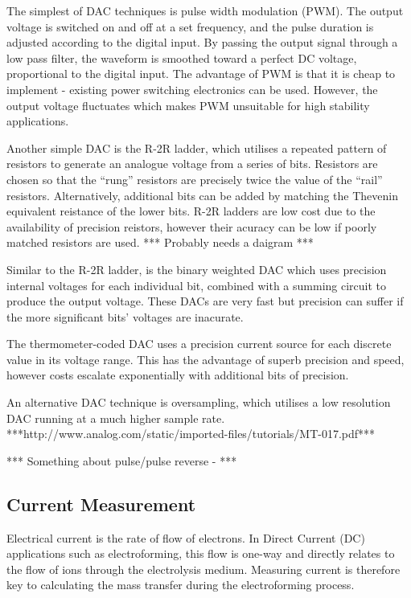 The simplest of DAC techniques is pulse width modulation (PWM). The output voltage is switched on and off at a set frequency, and the pulse duration is adjusted according to the digital input. By passing the output signal through a low pass filter, the waveform is smoothed toward a perfect DC voltage, proportional to the digital input. The advantage of PWM is that it is cheap to implement - existing power switching electronics can be used. However, the output voltage fluctuates which makes PWM unsuitable for high stability applications.

Another simple DAC is the R-2R ladder, which utilises a repeated pattern of resistors to generate an analogue voltage from a series of bits. Resistors are chosen so that the ``rung'' resistors are precisely twice the value of the ``rail'' resistors. Alternatively, additional bits can be added by matching the Thevenin equivalent reistance of the lower bits. R-2R ladders are low cost due to the availability of precision reistors, however their acuracy can be low if poorly matched resistors are used. *** Probably needs a daigram ***

Similar to the R-2R ladder, is the binary weighted DAC which uses precision internal voltages for each individual bit, combined with a summing circuit to produce the output voltage. These DACs are very fast but precision can suffer if the more significant bits' voltages are inacurate.


The thermometer-coded DAC uses a precision current source for each discrete value in its voltage range. This has the advantage of superb precision and speed, however costs escalate exponentially with additional bits of precision.

An alternative DAC technique is oversampling, which utilises a low resolution DAC running at a much higher sample rate.
***http://www.analog.com/static/imported-files/tutorials/MT-017.pdf***

*** Something about pulse/pulse reverse - \cite{Chandrasekar} ***


\subsection{Current Measurement}
Electrical current is the rate of flow of electrons. In Direct Current (DC) applications such as electroforming, this flow is one-way and directly relates to the flow of ions through the electrolysis medium. Measuring current is therefore key to calculating the mass transfer during the electroforming process.


